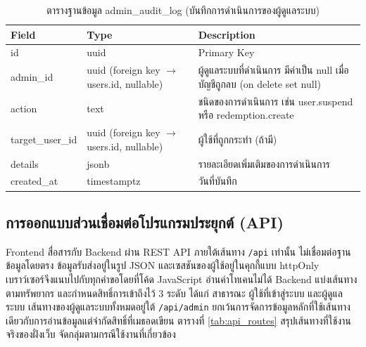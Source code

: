 \begin{table}[H]
\centering
\caption{ตารางฐานข้อมูล admin\_audit\_log (บันทึกการดำเนินการของผู้ดูแลระบบ)}
\label{tab:db_support}
\begin{tabular}{|p{3.6cm}|p{2.6cm}|p{6.8cm}|}
\hline
\textbf{Field} & \textbf{Type} & \textbf{Description} \\
\hline
id & uuid & Primary Key \\ \hline
admin\_id & uuid (foreign key $\to$ users.id, nullable) & ผู้ดูแลระบบที่ดำเนินการ มีค่าเป็น null เมื่อบัญชีถูกลบ (on delete set null) \\ \hline
action & text & ชนิดของการดำเนินการ เช่น user.suspend หรือ redemption.create \\ \hline
target\_user\_id & uuid (foreign key $\to$ users.id, nullable) & ผู้ใช้ที่ถูกกระทำ (ถ้ามี) \\ \hline
details & jsonb & รายละเอียดเพิ่มเติมของการดำเนินการ \\ \hline
created\_at & timestamptz & วันที่บันทึก \\
\hline
\end{tabular}
\end{table}

\subsection{การออกแบบส่วนเชื่อมต่อโปรแกรมประยุกต์ (API)}

Frontend สื่อสารกับ Backend ผ่าน REST API ภายใต้เส้นทาง \texttt{/api} เท่านั้น ไม่เชื่อมต่อฐานข้อมูลโดยตรง ข้อมูลรับส่งอยู่ในรูป JSON และเซสชันของผู้ใช้อยู่ในคุกกี้แบบ httpOnly เบราว์เซอร์จึงแนบไปกับทุกคำขอโดยที่โค้ด JavaScript อ่านค่าโทเคนไม่ได้ Backend แบ่งเส้นทางตามทรัพยากร และกำหนดสิทธิ์การเข้าถึงไว้ 3 ระดับ ได้แก่ สาธารณะ ผู้ใช้ที่เข้าสู่ระบบ และผู้ดูแลระบบ เส้นทางของผู้ดูแลระบบทั้งหมดอยู่ใต้ \texttt{/api/admin} ยกเว้นการจัดการข้อมูลหลักที่ใช้เส้นทางเดียวกับการอ่านข้อมูลแต่จำกัดสิทธิ์ที่เมธอดเขียน ตารางที่ \ref{tab:api_routes} สรุปเส้นทางที่ใช้งานจริงของฝั่งเว็บ จัดกลุ่มตามกรณีใช้งานที่เกี่ยวข้อง

